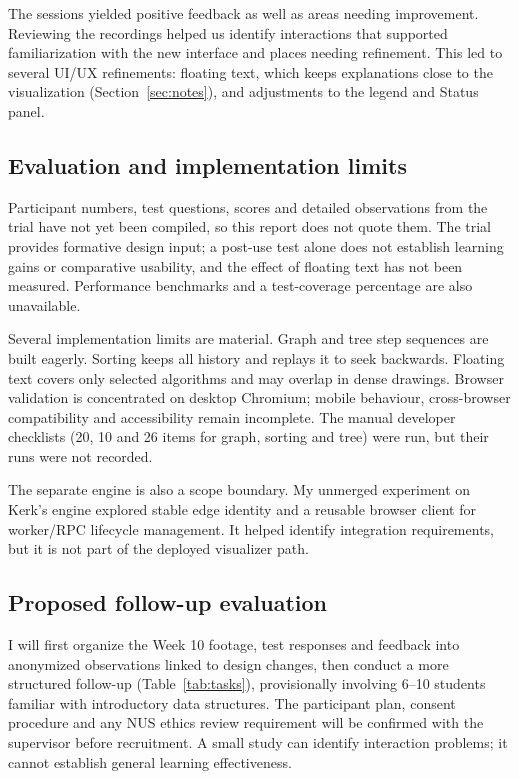 \documentclass[11pt,a4paper]{article}
\begin{document}
The sessions yielded positive feedback as well as areas needing improvement. Reviewing the recordings helped us identify interactions that supported familiarization with the new interface and places needing refinement. This led to several UI/UX refinements: floating text, which keeps explanations close to the visualization (Section~\ref{sec:notes}), and adjustments to the legend and Status panel.

\subsection{Evaluation and implementation limits}
Participant numbers, test questions, scores and detailed observations from the trial have not yet been compiled, so this report does not quote them. The trial provides formative design input; a post-use test alone does not establish learning gains or comparative usability, and the effect of floating text has not been measured. Performance benchmarks and a test-coverage percentage are also unavailable.

Several implementation limits are material. Graph and tree step sequences are built eagerly. Sorting keeps all history and replays it to seek backwards. Floating text covers only selected algorithms and may overlap in dense drawings. Browser validation is concentrated on desktop Chromium; mobile behaviour, cross-browser compatibility and accessibility remain incomplete. The manual developer checklists (20, 10 and 26 items for graph, sorting and tree) were run, but their runs were not recorded.

The separate engine is also a scope boundary. My unmerged experiment on Kerk's engine explored stable edge identity and a reusable browser client for worker/RPC lifecycle management. It helped identify integration requirements, but it is not part of the deployed visualizer path.

\subsection{Proposed follow-up evaluation}
I will first organize the Week 10 footage, test responses and feedback into anonymized observations linked to design changes, then conduct a more structured follow-up (Table~\ref{tab:tasks}), provisionally involving 6--10 students familiar with introductory data structures. The participant plan, consent procedure and any NUS ethics review requirement will be confirmed with the supervisor before recruitment. A small study can identify interaction problems; it cannot establish general learning effectiveness.
\end{document}
